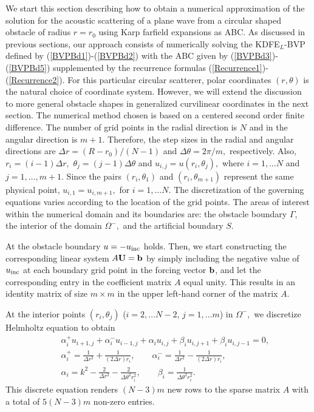 \documentclass[final,3p,times,12pt]{elsarticle}
\newcommand{\uinc}{u_{\rm inc}}
\newcommand{\uij}{u_{i,j}}
\newcommand{\uimj}{u_{i-1,j}}
\newcommand{\uiMj}{u_{i+1,j}}
\newcommand{\uijm}{u_{i,j-1}}
\newcommand{\uijM}{u_{i,j+1}}
\begin{document}
We start this section describing how to obtain a numerical approximation of the solution for the acoustic scattering of a plane wave from a circular shaped obstacle of radius $r=r_0$ using Karp farfield expansions as ABC. As discussed in previous sections, our approach consists of numerically solving the KDFE$_L$-BVP defined by  (\ref{BVPBd1})-(\ref{BVPBd2}) with the ABC given by (\ref{BVPBd3})-(\ref{BVPBd5}) supplemented by the recurrence formulas (\ref{Recurrence1})-(\ref{Recurrence2}).
For this particular circular scatterer, polar coordinates $(r,\theta)$ is the natural choice of coordinate system.
However, we will extend the discussion to more general obstacle shapes in generalized curvilinear coordinates in the next section. The numerical method chosen is based on a centered second  order finite difference. The number of grid points in the radial direction is $N$ and in the angular direction is $m+1.$
 Therefore, the step sizes in the radial and angular directions are $\Delta r =(R-r_0)/(N-1)$ and $\Delta\theta = 2\pi/m,$ respectively. Also, $r_i = (i-1)\Delta r,$ $\theta_j=(j-1)\Delta \theta$ and $u_{i,j}=u(r_i,\theta_j),$ where $i=1,\dots N$ and $j=1,\dots, m+1.$  Since the pairs $(r_i,\theta_1)$ and $(r_i,\theta_{m+1})$ represent the same physical point, $u_{i,1}=u_{i,m+1},$ for $i=1,\dots N.$
The discretization of the governing equations varies according to the location of the grid points. The areas of interest within the numerical domain and its boundaries are:  the obstacle boundary $\Gamma$, the interior of the domain $\Omega^{-},$ and the artificial boundary $S$.

At the obstacle boundary $u=-\uinc$ holds. Then, we start constructing the corresponding linear system $A{\bf U}={\bf b}$ by simply including the negative value of $\uinc$ at each boundary grid point in the forcing vector ${\bf b}$, and let the corresponding entry in the coefficient matrix $A$ equal unity. This results in an identity matrix of size $m\times m$ in the upper left-hand corner of the matrix $A$.

At the interior points $(r_i,\theta_j)$ ($i=2,\dots N-2$, $j=1,\dots m$) in $\Omega^{-},$ we discretize Helmholtz equation to obtain
\begin{eqnarray}
&&\alpha_i^{+}\uiMj + \alpha_i^{-}\uimj + \alpha_i\uij + \beta_i\uijM + \beta_i\uijm =0,\label{intequ}\\
&&\alpha_i^{+} = \tfrac{1}{\Delta r^2} + \tfrac{1}{(2\Delta r) r_i},\qquad
\alpha_i^{-} = \tfrac{1}{\Delta r^2} - \tfrac{1}{(2\Delta r) r_i},\nonumber\\
&&\alpha_i = k^2 - \tfrac{2}{\Delta r^2} - \tfrac{2}{\Delta \theta^2 r_i^2},\qquad
\beta_i = \tfrac{1}{\Delta \theta^2 r_i^2}.\nonumber
\end{eqnarray}
This discrete equation renders  $(N-3) m$ new rows to the sparse matrix  $A$ with a total of $5(N-3)m$ non-zero entries.
\end{document}
